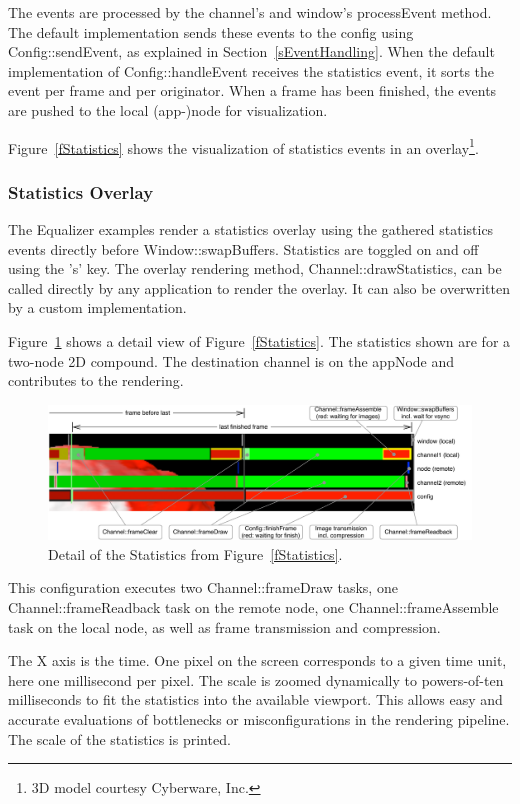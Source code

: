 \documentclass[10pt,a4]{scrartcl}
\newcommand{\fig}[1]{Figure~\ref{#1}}
\newcommand{\sref}[1]{Section~\ref{#1}}
\begin{document}
The events are processed by the channel's and window's
\textsf{processEvent} method. The default implementation sends these
events to the config using \textsf{Config::sendEvent}, as explained in
\sref{sEventHandling}. When the default implementation of
\textsf{Config::handleEvent} receives the statistics event, it sorts the
event per frame and per originator. When a frame has been finished, the
events are pushed to the local (app-)node for visualization.

\fig{fStatistics} shows the visualization of statistics events in an
overlay\footnote{3D model courtesy Cyberware, Inc.}.

\subsubsection{Statistics Overlay}

The Equalizer examples render a statistics overlay using the gathered
statistics events directly before
\textsf{Window::swapBuffers}. Statistics are toggled on and off using
the 's' key. The overlay rendering method,
\textsf{Channel::drawStatistics}, can be called directly by any
application to render the overlay. It can also be overwritten by a
custom implementation.

\fig{fStatisticsDetail} shows a detail view of \fig{fStatistics}. The
statistics shown are for a two-node 2D compound. The destination channel
is on the \textsf{appNode} and contributes to the rendering.

\begin{figure}[h!t]
  \includegraphics[width=\textwidth]{images/statisticsDetail}
  {\caption{\label{fStatisticsDetail}Detail of the Statistics from
      \fig{fStatistics}.}}
\end{figure}

This configuration executes two \textsf{Channel::frameDraw} tasks, one
\textsf{Channel::frame\-Read\-back} task on the remote node, one
\textsf{Channel::frameAssemble} task on the local node, as well as frame
transmission and compression.

The X axis is the time. One pixel on the screen corresponds to a given
time unit, here one millisecond per pixel. The scale is zoomed dynamically
to powers-of-ten milliseconds to fit the statistics into the available
viewport. This allows easy and accurate evaluations of bottlenecks or
misconfigurations in the rendering pipeline. The scale of the statistics
is printed.
\end{document}
